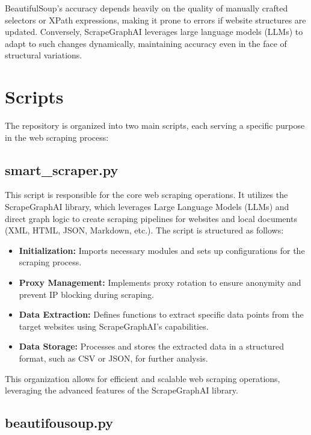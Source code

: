 BeautifulSoup's accuracy depends heavily on the quality of manually crafted selectors or XPath expressions, making it prone to errors if website structures are updated. Conversely, ScrapeGraphAI leverages large language models (LLMs) to adapt to such changes dynamically, maintaining accuracy even in the face of structural variations.



\section{Scripts}

The repository is organized into two main scripts, each serving a specific purpose in the web scraping process:

\subsection{smart\_scraper.py}

This script is responsible for the core web scraping operations. It utilizes the ScrapeGraphAI library, which leverages Large Language Models (LLMs) and direct graph logic to create scraping pipelines for websites and local documents (XML, HTML, JSON, Markdown, etc.). The script is structured as follows:

\begin{itemize}
    \item \textbf{Initialization:} Imports necessary modules and sets up configurations for the scraping process.
    \item \textbf{Proxy Management:} Implements proxy rotation to ensure anonymity and prevent IP blocking during scraping.
    \item \textbf{Data Extraction:} Defines functions to extract specific data points from the target websites using ScrapeGraphAI's capabilities.
    \item \textbf{Data Storage:} Processes and stores the extracted data in a structured format, such as CSV or JSON, for further analysis.
\end{itemize}

This organization allows for efficient and scalable web scraping operations, leveraging the advanced features of the ScrapeGraphAI library.

\subsection{beautifousoup.py}

